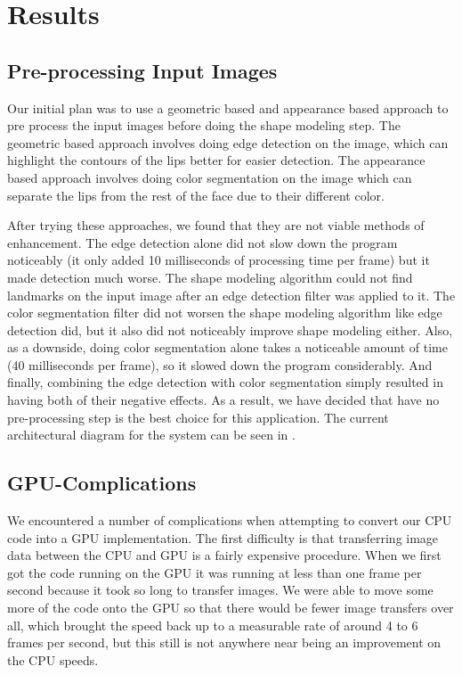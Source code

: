 \chapter{Results}

\section{Pre-processing Input Images}
Our initial plan was to use a geometric based and appearance based approach to pre process the input images before doing the shape modeling step. The geometric based approach involves doing edge detection on the image, which can highlight the contours of the lips better for easier detection. The appearance based approach involves doing color segmentation on the image which can separate the lips from the rest of the face due to their different color. 

After trying these approaches, we found that they are not viable methods of enhancement. The edge detection alone did not slow down the program noticeably (it only added 10 milliseconds of processing time per frame) but it made detection much worse. The shape modeling algorithm could not find landmarks on the input image after an edge detection filter was applied to it. The color segmentation filter did not worsen the shape modeling algorithm like edge detection did, but it also did not noticeably improve shape modeling either. Also, as a downside, doing color segmentation alone takes a noticeable amount of time (40 milliseconds per frame), so it slowed down the program considerably. And finally, combining the edge detection with color segmentation simply resulted in having both of their negative effects. As a result, we have decided that have no pre-processing step is the best choice for this application. The current architectural diagram for the system can be seen in .

\section{GPU-Complications}

We encountered a number of complications when attempting to convert our CPU code into a GPU implementation. The first difficulty is that transferring image data between the CPU and GPU is a fairly expensive procedure. When we first got the code running on the GPU it was running at less than one frame per second because it took so long to transfer images. We were able to move some more of the code onto the GPU so that there would be fewer image transfers over all, which brought the speed back up to a measurable rate of around 4 to 6 frames per second, but this still is not anywhere near being an improvement on the CPU speeds.

